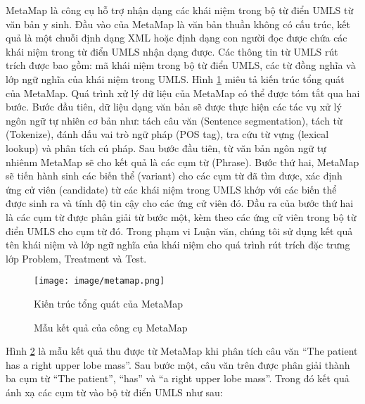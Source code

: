 MetaMap là công cụ hỗ trợ nhận dạng các khái niệm trong bộ từ điển UMLS từ văn bản y sinh. Đầu vào của MetaMap là văn bản thuần không có cấu trúc, kết quả là một chuỗi định dạng XML hoặc định dạng con người đọc được chứa các khái niệm trong từ điển UMLS nhận dạng được. Các thông tin từ UMLS rút trích được bao gồm: mã khái niệm trong bộ từ điển UMLS, các từ đồng nghĩa và lớp ngữ nghĩa của khái niệm trong UMLS. Hình \ref{metamapstructure} miêu tả kiến trúc tổng quát của MetaMap. Quá trình xử lý dữ liệu của MetaMap có thể được tóm tắt qua hai bước. Bước đầu tiên, dữ liệu dạng văn bản sẽ được thực hiện các tác vụ xử lý ngôn ngữ tự nhiên cơ bản như: tách câu văn (Sentence segmentation), tách từ (Tokenize), đánh dấu vai trò ngữ pháp (POS tag), tra cứu từ vựng (lexical lookup) và phân tích cú pháp. Sau bước đầu tiên, từ văn bản ngôn ngữ tự nhiênm MetaMap sẽ cho kết quả là các cụm từ (Phrase). Bước thứ hai, MetaMap sẽ tiến hành sinh các biến thể (variant) cho các cụm từ đã tìm được, xác định ứng cử viên (candidate) từ các khái niệm trong UMLS khớp với các biến thể được sinh ra và tính độ tin cậy cho các ứng cử viên đó. Đầu ra của bước thứ hai là các cụm từ được phân giải từ bước một, kèm theo các ứng cử viên trong bộ từ điển UMLS cho cụm từ đó. Trong phạm vi Luận văn, chúng tôi sử dụng kết quả tên khái niệm và lớp ngữ nghĩa của khái niệm cho quá trình rút trích đặc trưng lớp Problem, Treatment và Test.

\begin{figure}
\centering
\texttt{[image: image/metamap.png]}
\caption{Kiến trúc tổng quát của MetaMap\label{metamapstructure}}
\end{figure}

\begin{figure}[ht]
\centering
{}

\caption{Mẫu kết quả của công cụ MetaMap\label{metamapoutput}}
\end{figure}

Hình \ref{metamapoutput} là mẫu kết quả thu được từ MetaMap khi phân tích câu văn ``The patient has a right upper lobe mass''. Sau bước một, câu văn trên được phân giải thành ba cụm từ ``The patient'', ``has'' và ``a right upper lobe mass''. Trong đó kết quả ánh xạ các cụm từ vào bộ từ điển UMLS như sau:

